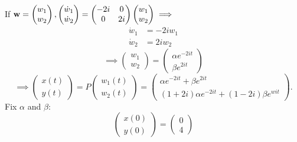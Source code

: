 \documentclass[10pt, a4paper]{article}
\begin{document}
\begin{problem}
\begin{solution}
\begin{enumerate}[label = (\alph*)]
            If $\mathbf{w} = \begin{pmatrix}
                w_1 \\ w_2
            \end{pmatrix},
            \begin{pmatrix}
                \dot{w}_1 \\ \dot{w}_2
            \end{pmatrix} = \begin{pmatrix}
                -2i & 0 \\ 0 & 2i
            \end{pmatrix}\begin{pmatrix}
                w_1 \\ w_2
            \end{pmatrix} \implies$
            \begin{align*}
                \dot{w}_1 &= -2iw_1 \\
                \dot{w}_2 &= 2iw_2
            \end{align*}
            \[
            \implies
            \begin{pmatrix}
                w_1 \\ w_2
            \end{pmatrix} = \begin{pmatrix}
                \alpha e ^ {-2it} \\
                \beta e ^ {2it}
            \end{pmatrix}
            \]
            \[
            \implies \begin{pmatrix}
                x(t) \\ y(t)
            \end{pmatrix} = P\begin{pmatrix}
                w_1(t) \\ w_2(t)
            \end{pmatrix} = \begin{pmatrix}
                \alpha e ^ {-2it} + \beta e ^ {2it} \\
                (1 + 2i)\alpha e ^ {-2it} + (1 - 2i)\beta e ^ {wit}
            \end{pmatrix}.
            \]
            Fix $\alpha$ and $\beta$:
            \[
            \begin{pmatrix}
                x(0) \\ y(0)
            \end{pmatrix} = \begin{pmatrix}
                0 \\ 4

\end{pmatrix}\]
\end{enumerate}
\end{solution}
\end{problem}
\end{document}
